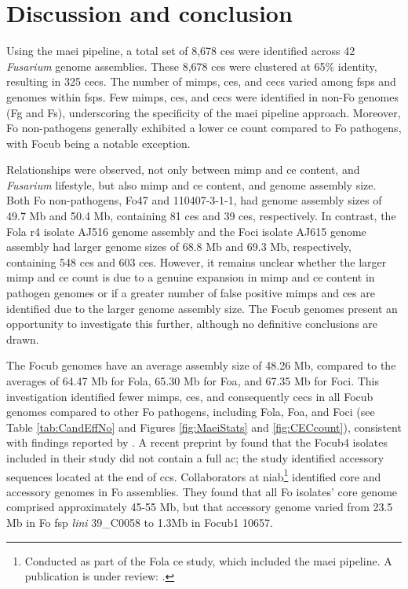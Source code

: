 \clearpage
\section{Discussion and conclusion}

Using the \ac{maei} pipeline, a total set of 8,678 \acp{ce} were identified across 42 \textit{Fusarium} genome assemblies. These 8,678 \acp{ce} were clustered at 65\% identity, resulting in 325 \acfp{cec}. The number of \acp{mimp}, \acp{ce}, and \acp{cec} varied among \acp{fsp} and genomes within \acp{fsp}. Few \acp{mimp}, \acp{ce}, and \acp{cec} were identified in non-\ac{Fo} genomes (\acl{Fg} and \acl{Fs}), underscoring the specificity of the \ac{maei} pipeline approach. Moreover, \ac{Fo} non-pathogens generally exhibited a lower \ac{ce} count compared to \ac{Fo} pathogens, with \ac{Focub} being a notable exception.

Relationships were observed, not only between \ac{mimp} and \ac{ce} content, and \textit{Fusarium} lifestyle,  but also \ac{mimp} and \ac{ce} content, and genome assembly size. Both \ac{Fo} non-pathogens, Fo47 and 110407-3-1-1, had genome assembly sizes of 49.7 Mb and 50.4 Mb, containing 81 \acp{ce} and 39 \acp{ce}, respectively. In contrast, the \ac{Fola} \ac{r4} isolate AJ516 genome assembly and the \ac{Foci} isolate AJ615 genome assembly had larger genome sizes of 68.8 Mb and 69.3 Mb, respectively, containing 548 \acp{ce} and 603 \acp{ce}. However, it remains unclear whether the larger \ac{mimp} and \ac{ce} count is due to a genuine expansion in \ac{mimp} and \ac{ce} content in pathogen genomes or if a greater number of false positive \acp{mimp} and \acp{ce} are identified due to the larger genome assembly size. The \ac{Focub} genomes present an opportunity to investigate this further, although no definitive conclusions are drawn.

The \ac{Focub} genomes have an average assembly size of 48.26 Mb, compared to the averages of 64.47 Mb for \ac{Fola}, 65.30 Mb for \ac{Foa}, and 67.35 Mb for \ac{Foci}. This investigation identified fewer \acp{mimp}, \acp{ce}, and consequently \acp{cec} in all \ac{Focub} genomes compared to other \ac{Fo} pathogens, including \ac{Fola}, \ac{Foa}, and \ac{Foci} (see Table \ref{tab:CandEffNo} and Figures \ref{fig:MaeiStats} and \ref{fig:CECcount}), consistent with findings reported by \textcite{Dam2016, FoEC2}. A recent preprint by \textcite{Ma2023} found that the \ac{Focub4} isolates included in their study did not contain a full \acf{ac}; the study identified accessory sequences located at the end of \acfp{cc}. Collaborators at \ac{niab}\footnote{Conducted as part of the \acf{Fola} \ac{ce} study, which included the \ac{maei} pipeline. A publication is under review: \textcite{FolaManuscript}.} identified core and accessory genomes in \ac{Fo} assemblies. They found that all \ac{Fo} isolates' core genome comprised approximately 45-55 Mb, but that accessory genome varied from 23.5 Mb in \ac{Fo} \ac{fsp} \textit{lini} 39\_C0058 to 1.3Mb in \ac{Focub1} 10657. 

